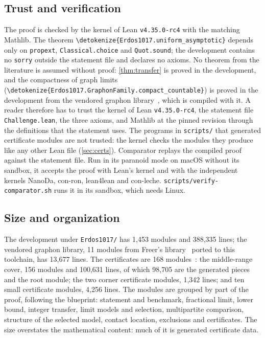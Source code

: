 \documentclass[10pt]{article}
\theoremstyle{definition}
\theoremstyle{remark}
\numberwithin{equation}{section}
\newcommand{\lean}[1]{\texttt{#1}}
\newcommand{\leanid}[1]{\expandafter\nolinkurl\expandafter{\detokenize{#1}}}
\newcommand{\Fm}[1]{\cite[#1]{Formalization}}
\begin{document}
\subsection{Trust and verification}
The proof is checked by the kernel of Lean \texttt{v4.35.0-rc4} with the matching Mathlib. The theorem \leanid{Erdos1017.uniform_asymptotic} depends only on \lean{propext}, \lean{Classical.choice} and \lean{Quot.sound}; the development contains no \lean{sorry} outside the statement file and declares no axioms. No theorem from the literature is assumed without proof: \cref{thm:transfer} is proved in the development, and the compactness of graph limits (\leanid{Erdos1017.GraphonFamily.compact_countable}) is proved in the development from the vendored graphon library~\cite{Freer}, which is compiled with it. A reader therefore has to trust the kernel of Lean \texttt{v4.35.0-rc4}, the statement file \lean{Challenge.lean}, the three axioms, and Mathlib at the pinned revision through the definitions that the statement uses. The programs in \lean{scripts/} that generated certificate modules are not trusted: the kernel checks the modules they produce like any other Lean file (\cref{sec:certs}). Comparator replays the compiled proof against the statement file. Run in its paranoid mode on macOS without its sandbox, it accepts the proof with Lean's kernel and with the independent kernels NanoDa, con-ron, lean4lean and con-leche. \lean{scripts/verify-comparator.sh} runs it in its sandbox, which needs Linux.

\subsection{Size and organization}
The development under \lean{Erdos1017/} has 1,453 modules and 388,335 lines; the vendored graphon library, 11 modules from Freer's library~\cite{Freer} ported to this toolchain, has 13,677 lines. The certificates are 168 modules~\Fm{\S11.1}: the middle-range cover, 156 modules and 100,631 lines, of which 98,705 are the generated pieces and the root module; the two corner certificate modules, 1,342 lines; and ten small certificate modules, 4,256 lines. The modules are grouped by part of the proof, following the blueprint: statement and benchmark, fractional limit, lower bound, integer transfer, limit models and selection, multipartite comparison, structure of the selected model, contact location, exclusions and certificates. The size overstates the mathematical content: much of it is generated certificate data.
\end{document}
